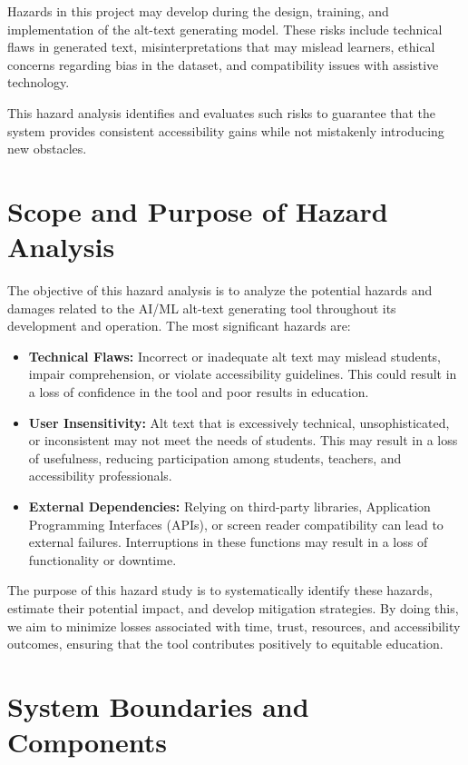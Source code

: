 \documentclass{article}
\begin{document}
Hazards in this project may develop during the design, training, and implementation of the alt-text generating model. These risks include technical flaws in generated text, misinterpretations that may mislead learners, ethical concerns regarding bias in the dataset, and compatibility issues with assistive technology.

This hazard analysis identifies and evaluates such risks to guarantee that the system provides consistent accessibility gains while not mistakenly introducing new obstacles.

\section{Scope and Purpose of Hazard Analysis}
The objective of this hazard analysis is to analyze the potential hazards and damages related to the AI/ML alt-text generating tool throughout its development and operation. The most significant hazards are:

\begin{itemize}
    \item \textbf{Technical Flaws:} Incorrect or inadequate alt text may mislead students, impair comprehension, or violate accessibility guidelines. This could result in a loss of confidence in the tool and poor results in education.
    \item \textbf{User Insensitivity:} Alt text that is excessively technical, unsophisticated, or inconsistent may not meet the needs of students. This may result in a loss of usefulness, reducing participation among students, teachers, and accessibility professionals.
    \item \textbf{External Dependencies:} Relying on third-party libraries, Application Programming Interfaces (APIs), or screen reader compatibility can lead to external failures. Interruptions in these functions may result in a loss of functionality or downtime.
\end{itemize}

The purpose of this hazard study is to systematically identify these hazards, estimate their potential impact, and develop mitigation strategies. By doing this, we aim to minimize losses associated with time, trust, resources, and accessibility outcomes, ensuring that the tool contributes positively to equitable education.

\section{System Boundaries and Components}
\end{document}
